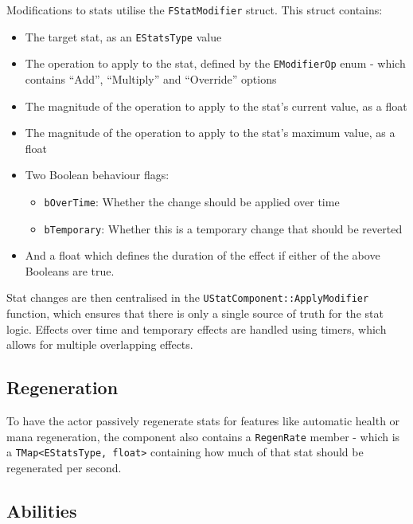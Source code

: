\documentclass{article}
\begin{document}
Modifications to stats utilise the \texttt{FStatModifier} struct. This struct contains:
\begin{itemize}
    \item The target stat, as an \texttt{EStatsType} value
    \item The operation to apply to the stat, defined by the \texttt{EModifierOp} enum - which contains “Add”, “Multiply” and “Override” options
    \item The magnitude of the operation to apply to the stat’s current value, as a float
    \item The magnitude of the operation to apply to the stat’s maximum value, as a float
    \item Two Boolean behaviour flags: 
    \begin{itemize}
        \item \texttt{bOverTime}: Whether the change should be applied over time
        \item \texttt{bTemporary}: Whether this is a temporary change that should be reverted
    \end{itemize}
    \item And a float which defines the duration of the effect if either of the above Booleans are true.
\end{itemize}

Stat changes are then centralised in the \texttt{UStatComponent::ApplyModifier} function, which ensures that there is only a single source of truth for the stat logic. Effects over time and temporary effects are handled using timers, which allows for multiple overlapping effects.

\subsection{Regeneration}

To have the actor passively regenerate stats for features like automatic health or mana regeneration, the component also contains a \texttt{RegenRate} member - which is a \texttt{TMap<EStatsType, float>} containing how much of that stat should be regenerated per second. 

\subsection{Abilities}
\end{document}
